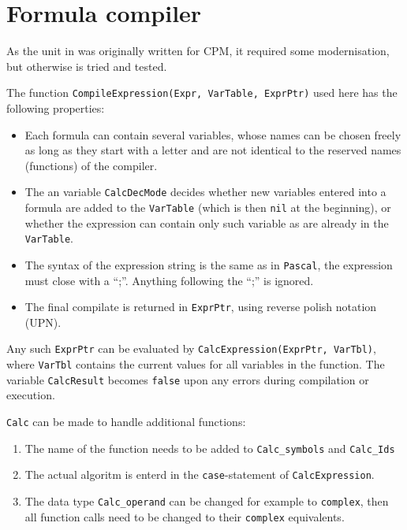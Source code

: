 \chapter{Formula compiler}
\begin{refsection}


As the unit in \parencite{Gie-87b,Eng-89} was originally written for \acs{CPM}, it required some modernisation, but otherwise is tried and tested.

The function \texttt{CompileExpression(Expr, VarTable, ExprPtr)} used here has the following properties:
\begin{itemize}
  \item{Each formula can contain several variables, whose names can be chosen freely as long as they start with a letter and are not identical to the reserved names (functions) of the compiler. }
  \item{The an variable \texttt{CalcDecMode} decides whether new variables entered into a formula are added to the \texttt{VarTable} (which is then \texttt{nil} at the beginning), or whether the expression can contain only such variable as are already in the \texttt{VarTable}.}
  \item{The syntax of the expression string is the same as in \texttt{Pascal}, the expression must close with a ``;''. Anything following the ``;'' is ignored. }
  \item{The final compilate is returned in \texttt{ExprPtr}, using reverse polish notation (UPN).}
\end{itemize}
Any such \texttt{ExprPtr} can be evaluated by \texttt{CalcExpression(ExprPtr, VarTbl)}, where \texttt{VarTbl} contains the current values for all variables in the function. The variable \texttt{CalcResult} becomes \texttt{false} upon any errors during compilation or execution.

\texttt{Calc} can be made to handle additional functions:
\begin{enumerate}
  \item{The name of the function needs to be added to \texttt{Calc\_symbols} and \texttt{Calc\_Ids}}
  \item{The actual algoritm is enterd in the \texttt{case}-statement of \texttt{CalcExpression}.}
  \item{The data type \texttt{Calc\_operand} can be changed for example to \texttt{complex}, then all function calls need to be changed to their \texttt{complex} equivalents.}
\end{enumerate}


\end{refsection}
